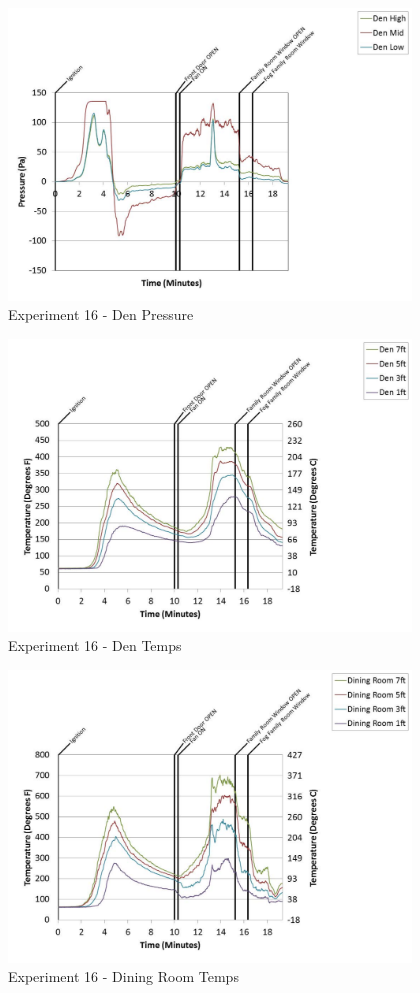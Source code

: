 \documentclass{article}
\begin{document}
\begin{appendices}
	\clearpage

	\begin{figure}[h!]
		\centering
		\includegraphics[height=3.05in]{0_Images/Results_Charts/Exp_16_Charts/DenPressure.pdf}
		\caption{Experiment 16 - Den Pressure}
	\end{figure}
 

	\begin{figure}[h!]
		\centering
		\includegraphics[height=3.05in]{0_Images/Results_Charts/Exp_16_Charts/DenTemps.pdf}
		\caption{Experiment 16 - Den Temps}
	\end{figure}
 
	\clearpage

	\begin{figure}[h!]
		\centering
		\includegraphics[height=3.05in]{0_Images/Results_Charts/Exp_16_Charts/DiningRoomTemps.pdf}
		\caption{Experiment 16 - Dining Room Temps}
	\end{figure}
 


\end{appendices}
\end{document}

